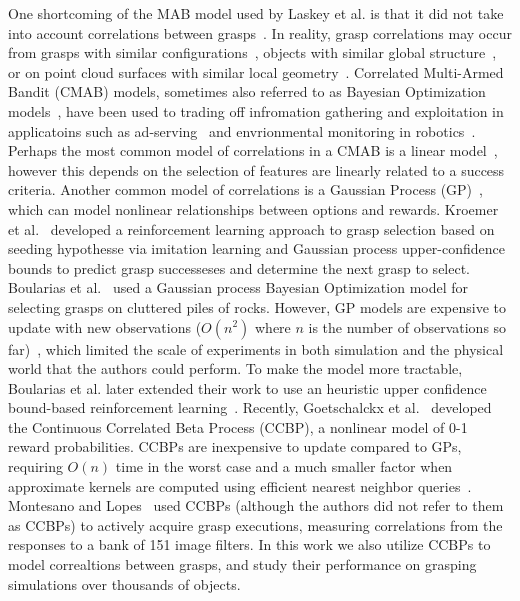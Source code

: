 One shortcoming of the MAB model used by Laskey et al. is that it did not take into account correlations between grasps~\cite{laskey2015bandits}.
In reality, grasp correlations may occur from grasps with similar configurations~\cite{ciocarlie2009, detry2011learning}, objects with similar global structure~\cite{pokorny2013grasp}, or on point cloud surfaces with similar local geometry~\cite{boularias2011learning, herzog2012template, kroemer2010combining, saxena2008robotic}.
Correlated Multi-Armed Bandit (CMAB) models, sometimes also referred to as Bayesian Optimization models~\cite{brochu2010tutorial}, have been used to trading off infromation gathering and exploitation in applicatoins such as ad-serving~\cite{chu2011contextual} and envrionmental monitoring in robotics~\cite{hitz2014fully, marchant2012bayesian}.
Perhaps the most common model of correlations in a CMAB is a linear model~\cite{chu2011contextual}, however this depends on the selection of features are linearly related to a success criteria.
Another common model of correlations is a Gaussian Process (GP)~\cite{rasmussen2006}, which can model nonlinear relationships between options and rewards.
Kroemer et al.~\cite{kroemer2010combining} developed a reinforcement learning approach to grasp selection based on seeding hypothesse via imitation learning and Gaussian process upper-confidence bounds to predict grasp successeses and determine the next grasp to select.
Boularias et al.~\cite{boularias2014efficient} used a Gaussian process Bayesian Optimization model for selecting grasps on cluttered piles of rocks. 
However, GP models are expensive to update with new observations ($O(n^2)$ where $n$ is the number of observations so far)~\cite{rasmussen2006}, which limited the scale of experiments in both simulation and the physical world that the authors could perform.
To make the model more tractable, Boularias et al. later extended their work to use an heuristic upper confidence bound-based reinforcement learning~\cite{boularias2015learning}.
Recently, Goetschalckx et al.~\cite{goetschalckx2011continuous} developed the Continuous Correlated Beta Process (CCBP), a nonlinear model of 0-1 reward probabilities.
CCBPs are inexpensive to update compared to GPs, requiring $O(n)$ time in the worst case and a much smaller factor when approximate kernels are computed using efficient nearest neighbor queries~\cite{goetschalckx2011continuous}.
Montesano and Lopes~\cite{montesano2012active} used CCBPs (although the authors did not refer to them as CCBPs) to actively acquire grasp executions, measuring correlations from the responses to a bank of 151 image filters.
In this work we also utilize CCBPs to model correaltions between grasps, and study their performance on grasping simulations over thousands of objects.









